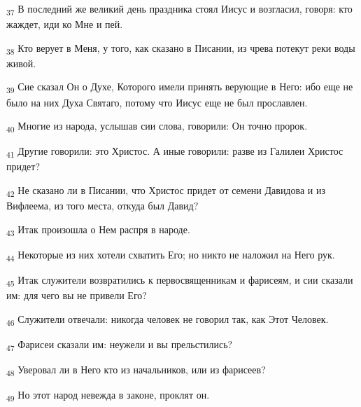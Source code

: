\begin{tcolorbox}
\textsubscript{37} В последний же великий день праздника стоял Иисус и возгласил, говоря: кто жаждет, иди ко Мне и пей.
\end{tcolorbox}
\begin{tcolorbox}
\textsubscript{38} Кто верует в Меня, у того, как сказано в Писании, из чрева потекут реки воды живой.
\end{tcolorbox}
\begin{tcolorbox}
\textsubscript{39} Сие сказал Он о Духе, Которого имели принять верующие в Него: ибо еще не было на них Духа Святаго, потому что Иисус еще не был прославлен.
\end{tcolorbox}
\begin{tcolorbox}
\textsubscript{40} Многие из народа, услышав сии слова, говорили: Он точно пророк.
\end{tcolorbox}
\begin{tcolorbox}
\textsubscript{41} Другие говорили: это Христос. А иные говорили: разве из Галилеи Христос придет?
\end{tcolorbox}
\begin{tcolorbox}
\textsubscript{42} Не сказано ли в Писании, что Христос придет от семени Давидова и из Вифлеема, из того места, откуда был Давид?
\end{tcolorbox}
\begin{tcolorbox}
\textsubscript{43} Итак произошла о Нем распря в народе.
\end{tcolorbox}
\begin{tcolorbox}
\textsubscript{44} Некоторые из них хотели схватить Его; но никто не наложил на Него рук.
\end{tcolorbox}
\begin{tcolorbox}
\textsubscript{45} Итак служители возвратились к первосвященникам и фарисеям, и сии сказали им: для чего вы не привели Его?
\end{tcolorbox}
\begin{tcolorbox}
\textsubscript{46} Служители отвечали: никогда человек не говорил так, как Этот Человек.
\end{tcolorbox}
\begin{tcolorbox}
\textsubscript{47} Фарисеи сказали им: неужели и вы прельстились?
\end{tcolorbox}
\begin{tcolorbox}
\textsubscript{48} Уверовал ли в Него кто из начальников, или из фарисеев?
\end{tcolorbox}
\begin{tcolorbox}
\textsubscript{49} Но этот народ невежда в законе, проклят он.
\end{tcolorbox}
